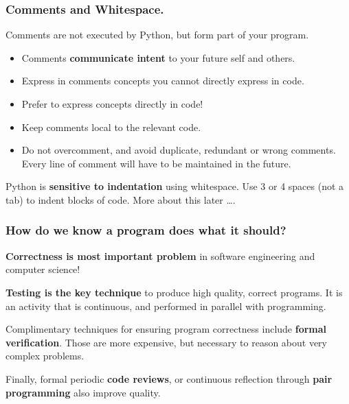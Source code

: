 \documentclass{beamer} %
\newcommand\emc[1]{\textcolor{brightblue}{\textbf{#1}}}
\begin{document}

\begin{frame}
\frametitle{Comments and Whitespace.}

Comments are not executed by Python, but form part of your program.
\begin{itemize}
\item Comments \emc{communicate intent} to your future self and others.
\item Express in comments concepts you cannot directly express in code.
\item Prefer to express concepts directly in code!
\item Keep comments local to the relevant code.
\item Do not overcomment, and avoid duplicate, redundant or wrong comments. Every line of comment will have to be maintained in the future.
\end{itemize}

Python is \emc{sensitive to indentation} using whitespace. Use 3 or 4 spaces (not a tab) to indent blocks of code. More about this later \ldots.

\end{frame}

\begin{frame}
\frametitle{How do we know a program does what it should?}

\emc{Correctness is most important problem} in software engineering and computer science!

\vspace{3mm}
\emc{Testing is the key technique} to produce high quality, correct programs. It is an activity that is continuous, and performed in parallel with programming.

\vspace{3mm}
Complimentary techniques for ensuring program correctness include \emc{formal verification}. Those are more expensive, but necessary to reason about very complex problems.

\vspace{3mm}
Finally, formal periodic \emc{code reviews}, or continuous reflection through \emc{pair programming} also improve quality.

\end{frame}
\end{document}
